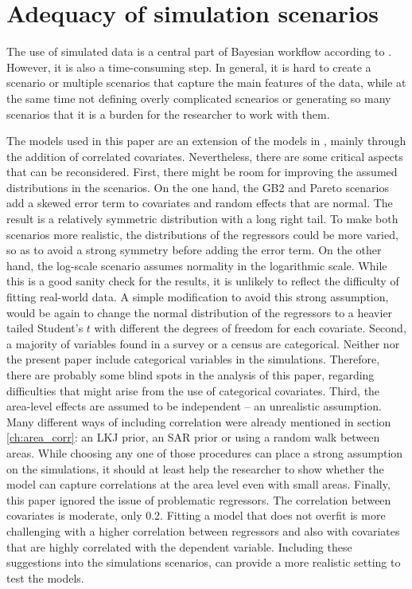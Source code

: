 \section{Adequacy of simulation scenarios}
\label{ch:adequacy_simulations}

The use of simulated data is a central part of Bayesian workflow according to \cite{gelman_bayesian_2020}.
However, it is also a time-consuming step.
In general, it is hard to create a scenario or multiple scenarios that capture the main features of the data, while at the same time not defining overly complicated scnearios or generating so many scenarios that it is a burden for the researcher to work with them.

The models used in this paper are an extension of the models in \cite{rojas_perilla_data_2020}, mainly through the addition of correlated covariates.
Nevertheless, there are some critical aspects that can be reconsidered.
First, there might be room for improving the assumed distributions in the scenarios.
On the one hand, the GB2 and Pareto scenarios add a skewed error term to covariates and random effects that are normal.
The result is a relatively symmetric distribution with a long right tail.
To make both scenarios more realistic, the distributions of the regressors could be more varied, so as to avoid a strong symmetry before adding the error term.
On the other hand, the log-scale scenario assumes normality in the logarithmic scale.
While this is a good sanity check for the results, it is unlikely to reflect the difficulty of fitting real-world data.
A simple modification to avoid this strong assumption, would be again to change the normal distribution of the regressors to a heavier tailed Student's $t$ with different the degrees of freedom for each covariate.
Second, a majority of variables found in a survey or a census are categorical.
Neither \cite{rojas_perilla_data_2020} nor the present paper include categorical variables in the simulations.
Therefore, there are probably some blind spots in the analysis of this paper, regarding difficulties that might arise from the use of categorical covariates.
Third, the area-level effects are assumed to be independent – an unrealistic assumption.
Many different ways of including correlation were already mentioned in section \ref{ch:area_corr}: an LKJ prior, an SAR prior or using a random walk between areas.
While choosing any one of those procedures can place a strong assumption on the simulations, it should at least help the researcher to show whether the model can capture correlations at the area level even with small areas.
Finally, this paper ignored the issue of problematic regressors.
The correlation between covariates is moderate, only 0.2.
Fitting a model that does not overfit is more challenging with a higher correlation between regressors and also with covariates that are highly correlated with the dependent variable.
Including these suggestions into the simulations scenarios, can provide a more realistic setting to test the models.

